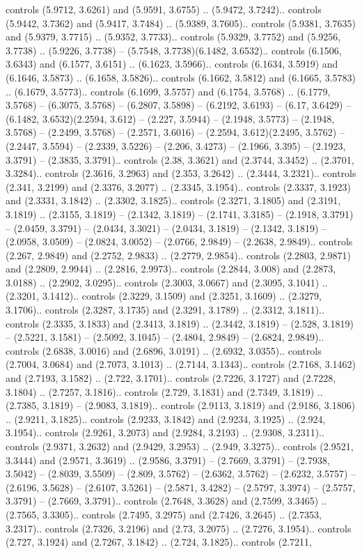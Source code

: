 controls (5.9712, 3.6261) and (5.9591, 3.6755) .. (5.9472, 3.7242).. controls (5.9442, 3.7362) and (5.9417, 3.7484) .. (5.9389, 3.7605).. controls (5.9381, 3.7635) and (5.9379, 3.7715) .. (5.9352, 3.7733).. controls (5.9329, 3.7752) and (5.9256, 3.7738) .. (5.9226, 3.7738) -- (5.7548, 3.7738)(6.1482, 3.6532).. controls (6.1506, 3.6343) and (6.1577, 3.6151) .. (6.1623, 3.5966).. controls (6.1634, 3.5919) and (6.1646, 3.5873) .. (6.1658, 3.5826).. controls (6.1662, 3.5812) and (6.1665, 3.5783) .. (6.1679, 3.5773).. controls (6.1699, 3.5757) and (6.1754, 3.5768) .. (6.1779, 3.5768) -- (6.3075, 3.5768) -- (6.2807, 3.5898) -- (6.2192, 3.6193) -- (6.17, 3.6429) -- (6.1482, 3.6532)(2.2594, 3.612) -- (2.227, 3.5944) -- (2.1948, 3.5773) -- (2.1948, 3.5768) -- (2.2499, 3.5768) -- (2.2571, 3.6016) -- (2.2594, 3.612)(2.2495, 3.5762) -- (2.2447, 3.5594) -- (2.2339, 3.5226) -- (2.206, 3.4273) -- (2.1966, 3.395) -- (2.1923, 3.3791) -- (2.3835, 3.3791).. controls (2.38, 3.3621) and (2.3744, 3.3452) .. (2.3701, 3.3284).. controls (2.3616, 3.2963) and (2.353, 3.2642) .. (2.3444, 3.2321).. controls (2.341, 3.2199) and (2.3376, 3.2077) .. (2.3345, 3.1954).. controls (2.3337, 3.1923) and (2.3331, 3.1842) .. (2.3302, 3.1825).. controls (2.3271, 3.1805) and (2.3191, 3.1819) .. (2.3155, 3.1819) -- (2.1342, 3.1819) -- (2.1741, 3.3185) -- (2.1918, 3.3791) -- (2.0459, 3.3791) -- (2.0434, 3.3021) -- (2.0434, 3.1819) -- (2.1342, 3.1819) -- (2.0958, 3.0509) -- (2.0824, 3.0052) -- (2.0766, 2.9849) -- (2.2638, 2.9849).. controls (2.267, 2.9849) and (2.2752, 2.9833) .. (2.2779, 2.9854).. controls (2.2803, 2.9871) and (2.2809, 2.9944) .. (2.2816, 2.9973).. controls (2.2844, 3.008) and (2.2873, 3.0188) .. (2.2902, 3.0295).. controls (2.3003, 3.0667) and (2.3095, 3.1041) .. (2.3201, 3.1412).. controls (2.3229, 3.1509) and (2.3251, 3.1609) .. (2.3279, 3.1706).. controls (2.3287, 3.1735) and (2.3291, 3.1789) .. (2.3312, 3.1811).. controls (2.3335, 3.1833) and (2.3413, 3.1819) .. (2.3442, 3.1819) -- (2.528, 3.1819) -- (2.5221, 3.1581) -- (2.5092, 3.1045) -- (2.4804, 2.9849) -- (2.6824, 2.9849).. controls (2.6838, 3.0016) and (2.6896, 3.0191) .. (2.6932, 3.0355).. controls (2.7004, 3.0684) and (2.7073, 3.1013) .. (2.7144, 3.1343).. controls (2.7168, 3.1462) and (2.7193, 3.1582) .. (2.722, 3.1701).. controls (2.7226, 3.1727) and (2.7228, 3.1804) .. (2.7257, 3.1816).. controls (2.729, 3.1831) and (2.7349, 3.1819) .. (2.7385, 3.1819) -- (2.9083, 3.1819).. controls (2.9113, 3.1819) and (2.9186, 3.1806) .. (2.9211, 3.1825).. controls (2.9233, 3.1842) and (2.9234, 3.1925) .. (2.924, 3.1954).. controls (2.9261, 3.2073) and (2.9284, 3.2193) .. (2.9308, 3.2311).. controls (2.9371, 3.2632) and (2.9429, 3.2953) .. (2.949, 3.3275).. controls (2.9521, 3.3444) and (2.9571, 3.3619) .. (2.9586, 3.3791) -- (2.7669, 3.3791) -- (2.7938, 3.5042) -- (2.8039, 3.5509) -- (2.809, 3.5762) -- (2.6362, 3.5762) -- (2.6232, 3.5757) -- (2.6196, 3.5628) -- (2.6107, 3.5261) -- (2.5871, 3.4282) -- (2.5797, 3.3974) -- (2.5757, 3.3791) -- (2.7669, 3.3791).. controls (2.7648, 3.3628) and (2.7599, 3.3465) .. (2.7565, 3.3305).. controls (2.7495, 3.2975) and (2.7426, 3.2645) .. (2.7353, 3.2317).. controls (2.7326, 3.2196) and (2.73, 3.2075) .. (2.7276, 3.1954).. controls (2.727, 3.1924) and (2.7267, 3.1842) .. (2.724, 3.1825).. controls (2.7211, 